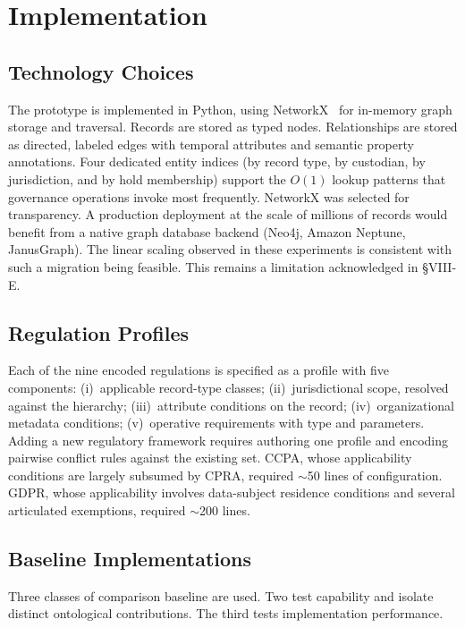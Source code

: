 \documentclass{ieeeaccess}
\begin{document}
\section{Implementation}

\subsection{Technology Choices}

The prototype is implemented in Python, using NetworkX~\cite{networkx} for in-memory graph storage and traversal. Records are stored as typed nodes. Relationships are stored as directed, labeled edges with temporal attributes and semantic property annotations. Four dedicated entity indices (by record type, by custodian, by jurisdiction, and by hold membership) support the $O(1)$ lookup patterns that governance operations invoke most frequently. NetworkX was selected for transparency. A production deployment at the scale of millions of records would benefit from a native graph database backend (Neo4j, Amazon Neptune, JanusGraph). The linear scaling observed in these experiments is consistent with such a migration being feasible. This remains a limitation acknowledged in §VIII-E.

\subsection{Regulation Profiles}

Each of the nine encoded regulations is specified as a profile with five components: (i)~applicable record-type classes; (ii)~jurisdictional scope, resolved against the hierarchy; (iii)~attribute conditions on the record; (iv)~organizational metadata conditions; (v)~operative requirements with type and parameters. Adding a new regulatory framework requires authoring one profile and encoding pairwise conflict rules against the existing set. CCPA, whose applicability conditions are largely subsumed by CPRA, required $\sim$50 lines of configuration. GDPR, whose applicability involves data-subject residence conditions and several articulated exemptions, required $\sim$200 lines.

\subsection{Baseline Implementations}

Three classes of comparison baseline are used. Two test capability and isolate distinct ontological contributions. The third tests implementation performance.
\end{document}
